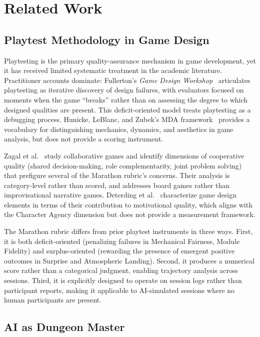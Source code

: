 
\section{Related Work}
\label{sec:related}

\subsection{Playtest Methodology in Game Design}

Playtesting is the primary quality-assurance mechanism in game development, yet it
has received limited systematic treatment in the academic literature. Practitioner
accounts dominate: Fullerton's \textit{Game Design Workshop}~\cite{fullerton2008}
articulates playtesting as iterative discovery of design failures, with evaluators
focused on moments when the game ``breaks'' rather than on assessing the degree to
which designed qualities are present. This deficit-oriented model treats playtesting
as a debugging process. Hunicke, LeBlanc, and Zubek's MDA framework~\cite{playtesting2019}
provides a vocabulary for distinguishing mechanics, dynamics, and aesthetics in game
analysis, but does not provide a scoring instrument.

Zagal et al.~\cite{zagal2008collaborative} study collaborative games and identify
dimensions of cooperative quality (shared decision-making, role complementarity, joint
problem solving) that prefigure several of the Marathon rubric's concerns. Their
analysis is category-level rather than scored, and addresses board games rather than
improvisational narrative games. Deterding et al.~\cite{deterding2011game} characterize
game design elements in terms of their contribution to motivational quality, which
aligns with the Character Agency dimension but does not provide a measurement framework.

The Marathon rubric differs from prior playtest instruments in three ways. First, it
is both deficit-oriented (penalizing failures in Mechanical Fairness, Module Fidelity)
and surplus-oriented (rewarding the presence of emergent positive outcomes in Surprise
and Atmospheric Landing). Second, it produces a numerical score rather than a
categorical judgment, enabling trajectory analysis across sessions. Third, it is
explicitly designed to operate on session logs rather than participant reports,
making it applicable to AI-simulated sessions where no human participants are present.

\subsection{AI as Dungeon Master}

